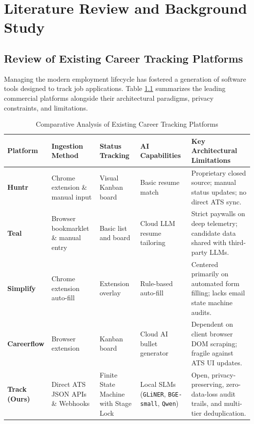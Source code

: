 \chapter{Literature Review and Background Study}
\label{ch:literature_review}

\section{Review of Existing Career Tracking Platforms}
Managing the modern employment lifecycle has fostered a generation of software tools designed to track job applications. Table \ref{tab:existing_platforms} summarizes the leading commercial platforms alongside their architectural paradigms, privacy constraints, and limitations.

\begin{table}[htbp]
\centering
\small
\caption{Comparative Analysis of Existing Career Tracking Platforms}
\label{tab:existing_platforms}
\begin{tabularx}{\textwidth}{l p{2.5cm} p{2.8cm} p{2.8cm} X}
\toprule
\textbf{Platform} & \textbf{Ingestion Method} & \textbf{Status Tracking} & \textbf{AI Capabilities} & \textbf{Key Architectural Limitations} \\
\midrule
\textbf{Huntr} & Chrome extension \& manual input & Visual Kanban board & Basic resume match & Proprietary closed source; manual status updates; no direct ATS sync. \\
\textbf{Teal} & Browser bookmarklet \& manual entry & Basic list and board & Cloud LLM resume tailoring & Strict paywalls on deep telemetry; candidate data shared with third-party LLMs. \\
\textbf{Simplify} & Chrome extension auto-fill & Extension overlay & Rule-based auto-fill & Centered primarily on automated form filling; lacks email state machine audits. \\
\textbf{Careerflow} & Browser extension & Kanban board & Cloud AI bullet generator & Dependent on client browser DOM scraping; fragile against ATS UI updates. \\
\midrule
\textbf{Track (Ours)} & Direct ATS JSON APIs \& Webhooks & Finite State Machine with Stage Lock & Local SLMs (\texttt{GLiNER}, \texttt{BGE-small}, \texttt{Qwen}) & Open, privacy-preserving, zero-data-loss audit trails, and multi-tier deduplication. \\
\bottomrule
\end{tabularx}
\end{table}

